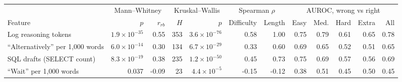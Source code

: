 \begin{tabular}{@{}l rr rr rr rrrrr@{}}
\toprule
 & \multicolumn{2}{c}{Mann--Whitney} & \multicolumn{2}{c}{Kruskal--Wallis} & \multicolumn{2}{c}{Spearman $\rho$} & \multicolumn{5}{c}{AUROC, wrong vs right} \\
\cmidrule(lr){2-3}\cmidrule(lr){4-5}\cmidrule(lr){6-7}\cmidrule(lr){8-12}
Feature & $p$ & $r_{rb}$ & $H$ & $p$ & Difficulty & Length & Easy & Med. & Hard & Extra & All \\
\midrule
Log reasoning tokens & $1.9\times10^{-35}$ & 0.55 & 353 & $3.6\times10^{-76}$ & 0.58 & 1.00 & 0.75 & 0.79 & 0.61 & 0.65 & 0.78 \\
``Alternatively'' per 1,000 words & $6.0\times10^{-14}$ & 0.30 & 134 & $6.7\times10^{-29}$ & 0.33 & 0.60 & 0.69 & 0.65 & 0.52 & 0.51 & 0.65 \\
SQL drafts (SELECT count) & $8.3\times10^{-19}$ & 0.38 & 235 & $1.2\times10^{-50}$ & 0.45 & 0.73 & 0.75 & 0.69 & 0.57 & 0.56 & 0.69 \\
``Wait'' per 1,000 words & 0.037 & -0.09 & 23 & $4.4\times10^{-5}$ & -0.15 & -0.12 & 0.38 & 0.51 & 0.45 & 0.50 & 0.45 \\
\bottomrule
\end{tabular}
